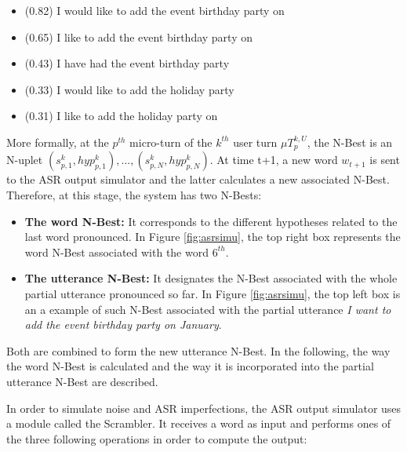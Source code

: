         \begin{itemize}
					\item (0.82) I would like to add the event birthday party on
					\item (0.65) I like to add the event birthday party on
					\item (0.43) I have had the event birthday party
					\item (0.33) I would like to add the holiday party
					\item (0.31) I like to add the holiday party on
        \end{itemize}
        
       	More formally, at the $p^{th}$ micro-turn of the $k^{th}$ user turn $\mu T^{k,U}_p$, the N-Best is an N-uplet ${(s^k_{p,1}, hyp^k_{p,1}),...,(s^k_{p,N}, hyp^k_{p,N})}$. At time t+1, a new word $w_{t+1}$ is sent to the ASR output simulator and the latter calculates a new associated N-Best. Therefore, at this stage, the system has two N-Bests:
				
				\begin{itemize}
					\item \textbf{The word N-Best:} It corresponds to the different hypotheses related to the last word pronounced. In Figure \ref{fig:asrsimu}, the top right box represents the word N-Best associated with the word $6^{th}$.
					\item \textbf{The utterance N-Best:} It designates the N-Best associated with the whole partial utterance pronounced so far. In Figure \ref{fig:asrsimu}, the top left box is an a example of such N-Best associated with the partial utterance \textit{I want to add the event birthday party on January}.
				\end{itemize}
				
				Both are combined to form the new utterance N-Best. In the following, the way the word N-Best is calculated and the way it is incorporated into the partial utterance N-Best are described.
				
				In order to simulate noise and ASR imperfections, the ASR output simulator uses a module called the Scrambler. It receives a word as input and performs ones of the three following operations in order to compute the output:
				
        
